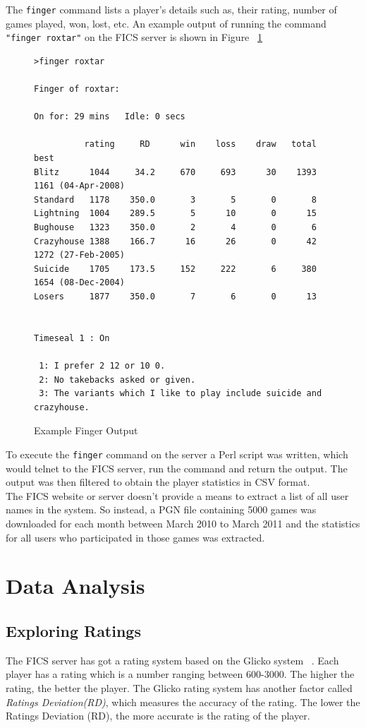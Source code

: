 \documentclass{article}
\begin{document}
The \verb=finger= command lists a player's details such as, their rating, number of games played, won, lost, etc. An example output of running the command \verb="finger roxtar"= on the FICS server is shown in Figure ~\ref{fig:finger}

\begin{figure}[htp]
\begin{verbatim}
>finger roxtar

Finger of roxtar:

On for: 29 mins   Idle: 0 secs

          rating     RD      win    loss    draw   total   best
Blitz      1044     34.2     670     693      30    1393   1161 (04-Apr-2008)
Standard   1178    350.0       3       5       0       8
Lightning  1004    289.5       5      10       0      15
Bughouse   1323    350.0       2       4       0       6
Crazyhouse 1388    166.7      16      26       0      42   1272 (27-Feb-2005)
Suicide    1705    173.5     152     222       6     380   1654 (08-Dec-2004)
Losers     1877    350.0       7       6       0      13


Timeseal 1 : On

 1: I prefer 2 12 or 10 0.
 2: No takebacks asked or given.
 3: The variants which I like to play include suicide and crazyhouse.
\end{verbatim}
\caption{Example Finger Output}
\label{fig:finger}
\end{figure}

\pagebreak

To execute the \verb=finger= command on the server a Perl script was written, which would telnet to the FICS server, run the command and return the output. The output was then filtered to obtain the player statistics in CSV format. \\

The FICS website or server doesn't provide a means to extract a list of all user names in the system. So instead, a PGN file containing 5000 games was downloaded for each month between March 2010 to March 2011 and the statistics for all users who participated in those games was extracted. 

\section{Data Analysis}

\subsection{Exploring Ratings}
The FICS server has got a rating system based on the Glicko system ~\cite{spec:glicko}. Each player has a rating which is a number ranging between 600-3000. The higher the rating, the better the player. The Glicko rating system has another factor called \textsl{Ratings Deviation(RD)}, which measures the accuracy of the rating. The lower the Ratings Deviation (RD), the more accurate is the rating of the player.\\
\end{document}
